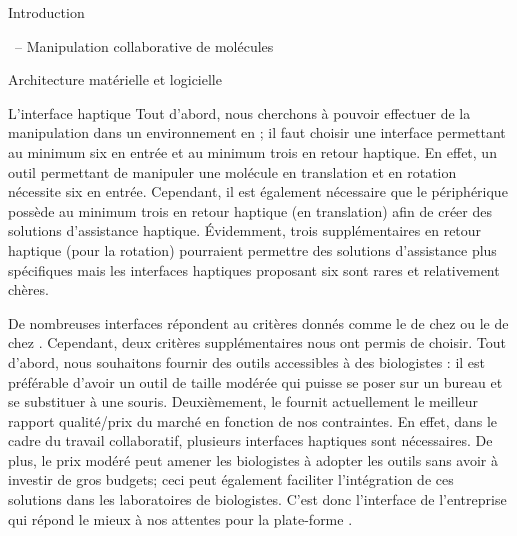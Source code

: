 \documentclass[myfrancais]{mythesis}
\begin{document}
\begin{mypart}{Introduction}
\begin{mychapter}{\myShaddock\ -- Manipulation collaborative de molécules}
\begin{mysection}{Architecture matérielle et logicielle}
\begin{mysubsection}{L'interface haptique}
					Tout d'abord, nous cherchons à pouvoir effectuer de la manipulation dans un environnement en \myThreeD; il faut choisir une interface permettant au minimum six  en entrée et au minimum trois  en retour haptique.
					En effet, un outil permettant de manipuler une molécule en translation et en rotation nécessite six  en entrée.
					Cependant, il est également nécessaire que le périphérique possède au minimum trois  en retour haptique (en translation) afin de créer des solutions d'assistance haptique.
					Évidemment, trois  supplémentaires en retour haptique (pour la rotation) pourraient permettre des solutions d'assistance plus spécifiques mais les interfaces haptiques proposant six  sont rares et relativement chères.

					De nombreuses interfaces répondent au critères donnés comme le \myPremium de chez \mySensAble ou le \myVirtuose de chez \myHaption.
					Cependant, deux critères supplémentaires nous ont permis de choisir.
					Tout d'abord, nous souhaitons fournir des outils accessibles à des biologistes : il est préférable d'avoir un outil de taille modérée qui puisse se poser sur un bureau et se substituer à une souris.
					Deuxièmement, le \myOmni fournit actuellement le meilleur rapport qualité/prix du marché en fonction de nos contraintes.
					En effet, dans le cadre du travail collaboratif, plusieurs interfaces haptiques sont nécessaires.
					De plus, le prix modéré peut amener les biologistes à adopter les outils sans avoir à investir de gros budgets; ceci peut également faciliter l'intégration de ces solutions dans les laboratoires de biologistes.
					C'est donc l'interface \myOmni {} de l'entreprise \mySensAble qui répond le mieux à nos attentes pour la plate-forme \myShaddock {}.

					\begin{myfigure}
					\end{myfigure}


\end{mysubsection}
\end{mysection}
\end{mychapter}
\end{mypart}
\end{document}
